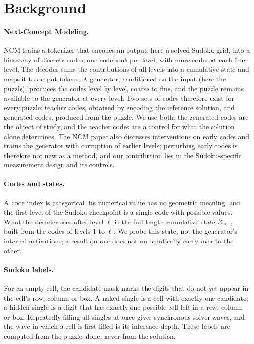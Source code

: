 \section{Background}
\label{sec:background}

\paragraph{Next-Concept Modeling.} NCM \citep{kumbong2026ncm} trains a tokenizer that encodes an output, here a solved Sudoku grid, into a hierarchy of discrete codes, one codebook per level, with more codes at each finer level. The decoder sums the contributions of all levels into a cumulative state and maps it to output tokens. A generator, conditioned on the input (here the puzzle), produces the codes level by level, coarse to fine, and the puzzle remains available to the generator at every level. Two sets of codes therefore exist for every puzzle: teacher codes, obtained by encoding the reference solution, and generated codes, produced from the puzzle. We use both: the generated codes are the object of study, and the teacher codes are a control for what the solution alone determines. The NCM paper also discusses interventions on early codes and trains the generator with corruption of earlier levels; perturbing early codes is therefore not new as a method, and our contribution lies in the Sudoku-specific measurement design and its controls.

\paragraph{Codes and states.} A code index is categorical: its numerical value has no geometric meaning, and the first level of the Sudoku checkpoint is a single code with  possible values. What the decoder sees after level $\ell$ is the full-length cumulative state $Z_{\le\ell}$ built from the codes of levels 1 to $\ell$. We probe this state, not the generator's internal activations; a result on one does not automatically carry over to the other.

\paragraph{Sudoku labels.} For an empty cell, the candidate mask marks the digits that do not yet appear in the cell's row, column or box. A naked single is a cell with exactly one candidate; a hidden single is a digit that has exactly one possible cell left in a row, column or box. Repeatedly filling all singles at once gives synchronous solver waves, and the wave in which a cell is first filled is its inference depth. These labels are computed from the puzzle alone, never from the solution.

